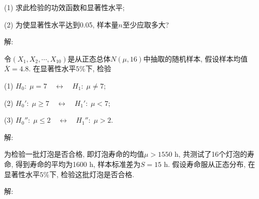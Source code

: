 \documentclass[standard]{ExBook}
\begin{document}
\begin{qitems}
\begin{bbox}
\begin{shaded}
(1) 求此检验的功效函数和显著性水平;

(2) 为使显著性水平达到0.05, 样本量$n$至少应取多大?
    \end{shaded}
    \end{bbox}

\vspace{-5em}

    \begin{bbox}
解: 
    \end{bbox}

\vspace{-5em}

    \begin{bbox} 
    \begin{shaded}
        \qitem
令$\left(X_1,X_2,\cdots,X_{10}\right)$是从正态总体$N(\mu, 16)$中抽取的随机样本, 假设样本均值$\overline{X} = 4.8$. 在显著性水平$5\%$下, 检验

(1) $H_0: \; \mu = 7 \quad \longleftrightarrow \quad H_1: \; \mu \neq 7$;

(2) $H_0': \; \mu \ge 7 \quad \longleftrightarrow \quad H_1': \; \mu < 7$;

(3) $H_0'': \; \mu \le 2 \quad \longleftrightarrow \quad H_1'': \; \mu > 2$.
    \end{shaded}
    \end{bbox}

\vspace{-5em}

    \begin{bbox}
解: 
    \end{bbox}

\vspace{-5em}

    \begin{bbox} 
    \begin{shaded}
        \qitem
为检验一批灯泡是否合格, 即灯泡寿命的均值$\mu > 1550$ h, 共测试了16个灯泡的寿命, 得到寿命的平均为1600 h, 样本标准差为$S = 15$ h. 假设寿命服从正态分布, 在显著性水平$5\%$下, 检验这批灯泡是否合格.
    \end{shaded}
    \end{bbox}


\vspace{-5em}

    \begin{bbox}
解: 
    \end{bbox}

\vspace{-5em}


\end{qitems}
\end{document}
